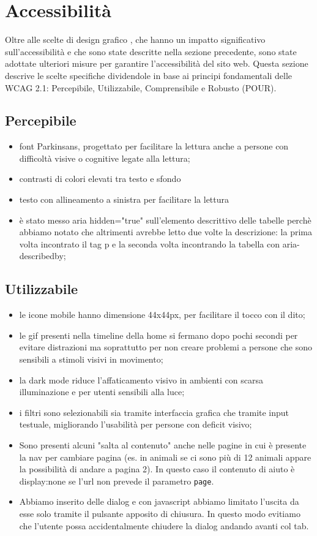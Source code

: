 \section{Accessibilità}
\label{sec:accessibilita}
Oltre alle scelte di design grafico , che hanno un impatto significativo sull'accessibilità e che sono state descritte nella sezione precedente, sono state adottate ulteriori misure per garantire l'accessibilità del sito web.
Questa sezione descrive le scelte specifiche dividendole in base ai principi fondamentali delle WCAG 2.1: Percepibile, Utilizzabile, Comprensibile e Robusto (POUR).
\subsection{Percepibile}
\begin{itemize}
    \item font Parkinsans, progettato per facilitare la lettura anche a persone con difficoltà visive o cognitive legate alla lettura;
    \item contrasti di colori elevati tra testo e sfondo
    \item testo con allineamento a sinistra per facilitare la lettura
    \item è stato messo aria hidden="true" sull'elemento descrittivo delle tabelle perchè abbiamo notato che altrimenti avrebbe letto due volte la descrizione: la prima volta incontrato il tag p e la seconda volta incontrando la tabella con aria-describedby;
\end{itemize}
\subsection{Utilizzabile}
\begin{itemize}
    \item le icone mobile hanno dimensione 44x44px, per facilitare il tocco con il dito;
    \item le gif presenti nella timeline della home si fermano dopo pochi secondi per evitare distrazioni ma soprattutto per non creare problemi a persone che sono sensibili a stimoli visivi in movimento;
    \item la dark mode riduce l'affaticamento visivo in ambienti con scarsa illuminazione e per utenti sensibili alla luce;
    \item i filtri sono selezionabili sia tramite interfaccia grafica che tramite input testuale, migliorando l'usabilità per persone con deficit visivo;
    \item Sono presenti alcuni "salta al contenuto" anche nelle pagine in cui è presente la nav per cambiare pagina (es. in animali se ci sono più di 12 animali appare la possibilità di andare a pagina 2). In questo caso il contenuto di aiuto è display:none se l'url non prevede il parametro \texttt{page}.
    \item Abbiamo inserito delle dialog e con javascript abbiamo limitato l'uscita da esse solo tramite il pulsante apposito di chiusura. In questo modo evitiamo che l'utente possa accidentalmente chiudere la dialog andando avanti col tab.
\end{itemize}
